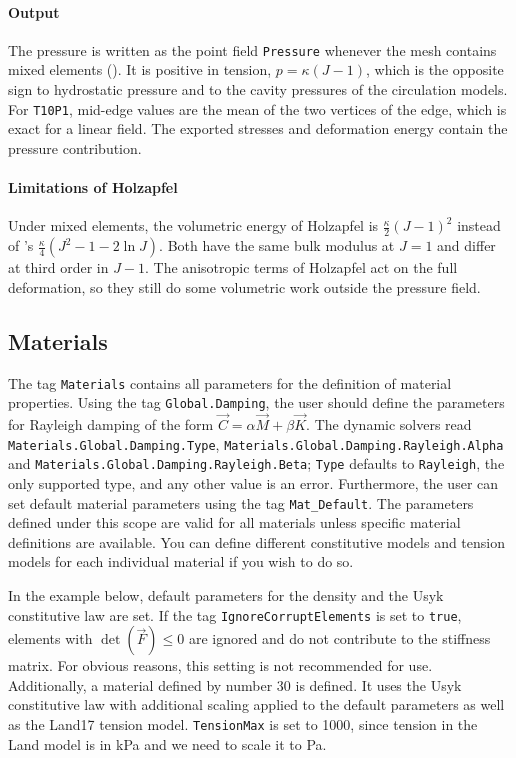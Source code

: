 \paragraph{Output}
The pressure is written as the point field \verb|Pressure| whenever the mesh contains mixed elements ().
It is positive in tension, $p = \kappa (J-1)$, which is the opposite sign to hydrostatic pressure and to the cavity pressures of the circulation models.
For \verb+T10P1+, mid-edge values are the mean of the two vertices of the edge, which is exact for a linear field.
The exported stresses and deformation energy contain the pressure contribution.

\paragraph{Limitations of Holzapfel}
Under mixed elements, the volumetric energy of Holzapfel is $\frac{\kappa}{2}(J-1)^2$ instead of 's $\frac{\kappa}{4}(J^2-1-2\ln J)$.
Both have the same bulk modulus at $J=1$ and differ at third order in $J-1$.
The anisotropic terms of Holzapfel act on the full deformation, so they still do some volumetric work outside the pressure field.

\subsection{Materials}
\label{settings:Material}

The tag \verb|Materials| contains all parameters for the definition of material properties.
Using the tag \verb|Global.Damping|, the user should define the parameters for Rayleigh damping of the form $\vec C = \alpha \vec M + \beta \vec K$.
The dynamic solvers read \verb|Materials.Global.Damping.Type|, \verb|Materials.Global.Damping.Rayleigh.Alpha| and \verb|Materials.Global.Damping.Rayleigh.Beta|; \verb|Type| defaults to \verb|Rayleigh|, the only supported type, and any other value is an error.
Furthermore, the user can set default material parameters using the tag \verb|Mat_Default|.
The parameters defined under this scope are valid for all materials unless specific material definitions are available.
You can define different constitutive models and tension models for each individual material if you wish to do so.

In the example below, default parameters for the density and the Usyk constitutive law are set.
If the tag \verb|IgnoreCorruptElements| is set to \verb|true|, elements with $\det(\vec F) \leq 0$ are ignored and do not contribute to the stiffness matrix.
For obvious reasons, this setting is not recommended for use.
Additionally, a material defined by number 30 is defined.
It uses the Usyk constitutive law with additional scaling applied to the default parameters as well as the Land17 tension model.
\verb|TensionMax| is set to 1000, since tension in the Land model is in \si{kPa} and we need to scale it to \si{Pa}.

